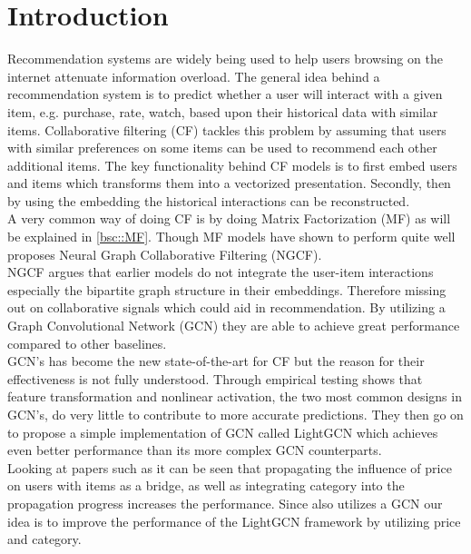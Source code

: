 \section{Introduction}
Recommendation systems are widely being used to help users browsing on the internet attenuate information overload\cite{YT_rec,Pint_rec}.
The general idea behind a recommendation system is to predict whether a user will interact with a given item, e.g. purchase, rate, watch, based upon their historical data with similar items.
Collaborative filtering (CF) tackles this problem by assuming that users with similar preferences on some items can be used to recommend each other additional items.
The key functionality behind CF models is to first embed users and items which transforms them into a vectorized presentation.
Secondly, then by using the embedding the historical interactions can be reconstructed.
\\
A very common way of doing CF is by doing Matrix Factorization (MF) as will be explained in \autoref{bsc::MF}.
Though MF models have shown to perform quite well \cite{NGCF_2019} proposes Neural Graph Collaborative Filtering (NGCF).
\\ 
NGCF argues that earlier models do not integrate the user-item interactions especially the bipartite graph structure in their embeddings.
Therefore missing out on collaborative signals which could aid in recommendation.
By utilizing a Graph Convolutional Network (GCN) they are able to achieve great performance compared to other baselines.
\\
GCN's has become the new state-of-the-art for CF but the reason for their effectiveness is not fully understood\cite{lightgcn}.
Through empirical testing \cite{lightgcn} shows that feature transformation and nonlinear activation, the two most common designs in GCN's, do very little to contribute to more accurate predictions.
They then go on to propose a simple implementation of GCN called LightGCN which achieves even better performance than its more complex GCN counterparts.
\\
Looking at papers such as \cite{Priceaware} it can be seen that propagating the influence of price on users with items as a bridge, as well as integrating category into the propagation progress increases the performance.
Since \cite{Priceaware} also utilizes a GCN our idea is to improve the performance of the LightGCN framework by utilizing price and category.
